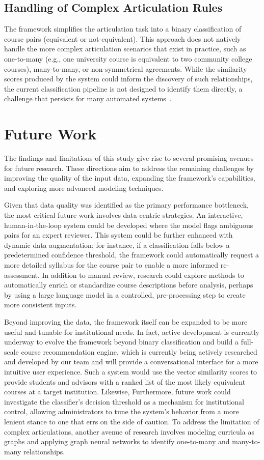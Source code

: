 \subsection{Handling of Complex Articulation Rules}\label{ch:5.2.4}
The framework simplifies the articulation task into a binary classification of course pairs (equivalent or not-equivalent). This approach does not natively handle the more complex articulation scenarios that exist in practice, such as one-to-many (e.g., one university course is equivalent to two community college courses), many-to-many, or non-symmetrical agreements. While the similarity scores produced by the system could inform the discovery of such relationships, the current classification pipeline is not designed to identify them directly, a challenge that persists for many automated systems~\cite{pardos-articulation-2019}.

\section{Future Work}\label{ch:5.3}
The findings and limitations of this study give rise to several promising avenues for future research. These directions aim to address the remaining challenges by improving the quality of the input data, expanding the framework's capabilities, and exploring more advanced modeling techniques.

Given that data quality was identified as the primary performance bottleneck, the most critical future work involves data-centric strategies. An interactive, human-in-the-loop system could be developed where the model flags ambiguous pairs for an expert reviewer. This system could be further enhanced with dynamic data augmentation; for instance, if a classification falls below a predetermined confidence threshold, the framework could automatically request a more detailed syllabus for the course pair to enable a more informed re-assessment. In addition to manual review, research could explore methods to automatically enrich or standardize course descriptions before analysis, perhaps by using a large language model in a controlled, pre-processing step to create more consistent inputs.

Beyond improving the data, the framework itself can be expanded to be more useful and tunable for institutional needs. In fact, active development is currently underway to evolve the framework beyond binary classification and build a full-scale course recommendation engine, which is currently being actively researched and developed by our team and will provide a conversational interface for a more intuitive user experience. Such a system would use the vector similarity scores to provide students and advisors with a ranked list of the most likely equivalent courses at a target institution. Likewise, Furthermore, future work could investigate the classifier's decision threshold as a mechanism for institutional control, allowing administrators to tune the system's behavior from a more lenient stance to one that errs on the side of caution. To address the limitation of complex articulations, another avenue of research involves modeling curricula as graphs and applying graph neural networks to identify one-to-many and many-to-many relationships.

